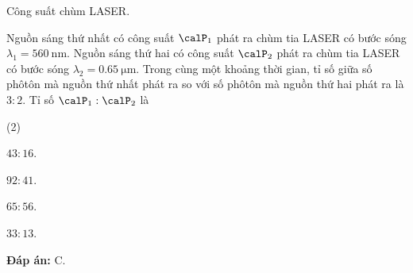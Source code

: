 \begin{dang}{Công suất chùm LASER.}
{		Nguồn sáng thứ nhất có công suất $\calP_1$ phát ra chùm tia LASER có bước sóng $\lambda_1 = \SI{560}{\nano \meter}$. Nguồn sáng thứ hai có công suất $\calP_2$ phát ra chùm tia LASER có bước sóng $\lambda_2 = \SI{0.65}{\micro \meter}$. Trong cùng một khoảng thời gian, tỉ số giữa số phôtôn mà nguồn thứ nhất phát ra so với số phôtôn mà nguồn thứ hai phát ra là $3:2$. Tỉ số $\calP_1:\calP_2$ là 
		\begin{mcq}(2)
			\item $43:16$.
			\item $92:41$.
			\item $65:56$.
			\item $33:13$.
		\end{mcq}
		
		\textbf{Đáp án:} C.}
	
\end{dang}

